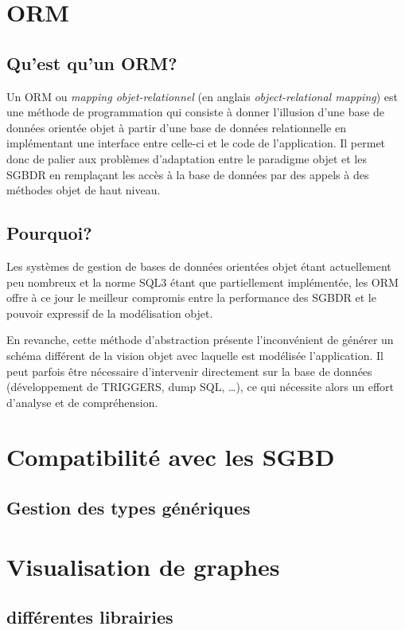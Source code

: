 \section{ORM}

	\subsection{Qu'est qu'un ORM?}
    Un ORM ou \emph{mapping objet-relationnel} (en anglais \emph{object-relational mapping}) est une méthode de programmation qui consiste à donner l'illusion d'une base de données orientée objet à partir d'une base de données relationnelle en implémentant une interface entre celle-ci et le code de l'application. Il permet donc de palier aux problèmes d'adaptation entre le paradigme objet et les SGBDR en remplaçant les accès à la base de données par des appels à des méthodes objet de haut niveau.
   
	\subsection{Pourquoi?}
    Les systèmes de gestion de bases de données orientées objet étant actuellement peu nombreux et la norme SQL3 étant que partiellement implémentée, les ORM offre à ce jour le meilleur compromis entre la performance des SGBDR et le pouvoir expressif de la modélisation objet.
    
En revanche, cette méthode d'abstraction présente l'inconvénient de générer un schéma différent de la vision objet avec laquelle est modélisée l'application. Il peut parfois être nécessaire d'intervenir directement sur la base de données (développement de TRIGGERS, dump SQL, \ldots), ce qui nécessite alors un effort d'analyse et de compréhension.

\section{Compatibilité avec les SGBD}

	\subsection{Gestion des types génériques}
	\label{section:generic_types}


\section{Visualisation de graphes}
  \subsection{différentes librairies}
